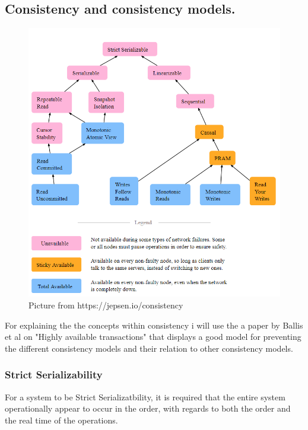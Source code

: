 \documentclass[a4paper,10pt,titlepage]{report}
\begin{document}
\subsection{Consistency and consistency models.}


\begin{figure}
    \centering
       \includegraphics[scale=0.4]{images/consistency models.PNG}
     \caption{Picture from https://jepsen.io/consistency}
     \label{fig:jepsenioconsistency}
\end{figure}


For explaining the the concepts within consistency i will use the a paper by Ballis et al on "Highly available transactions"\cite{10.14778/2732232.2732237} that displays a good model for preventing the different consistency models and their relation to other consistency models.\\


\subsubsection{Strict Serializability}

For a system to be Strict Serializatbility, it is required that the entire system operationally appear to occur in the order, with regards to both the order and the real time of the operations.
\end{document}
